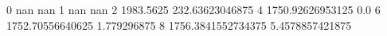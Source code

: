0 nan nan
1 nan nan
2 1983.5625 232.63623046875
4 1750.92626953125 0.0
6 1752.70556640625 1.779296875
8 1756.3841552734375 5.4578857421875
